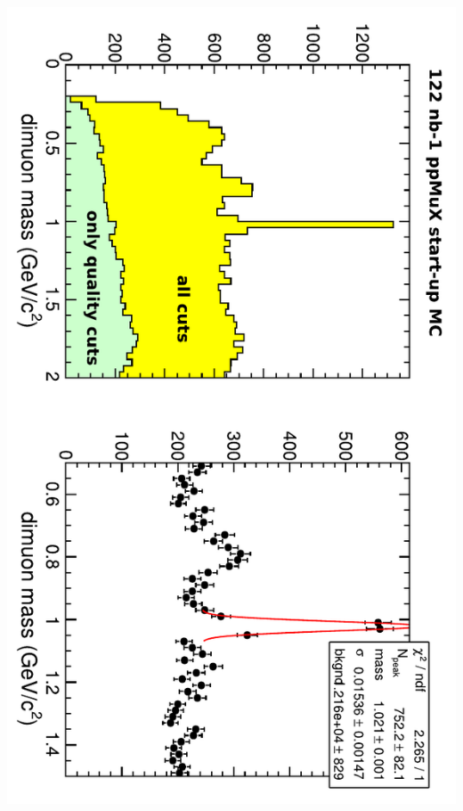 \documentclass[compress]{beamer}
\begin{document}
\begin{frame}
\begin{columns}
\includegraphics[height=\linewidth, angle=90]{phi_to_mumu_MC.pdf}
\end{columns}
\end{frame}



\end{document}
